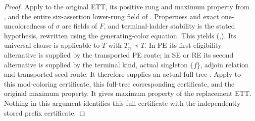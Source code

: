 \begin{proof}
Apply  to the original ETT, its positive rung and maximum
property from , and the entire
six-assertion lower-rung field of
. Properness and exact
one-uncoloredness of $\sigma$ are fields of $F$, and terminal-ladder
stability is the stated hypothesis, rewritten using the generating-color
equation. This yields (,\sigma).
Its universal clause is applicable to $T$ with $T_n\prec T$. In PE its
first eligibility alternative is supplied by the transported PE route;
in SE or RE its second alternative is supplied by the terminal kind,
actual singleton $\{f\}$, adjoin relation and transported seed route.
It therefore supplies an actual full-tree
. Apply
 to this mod-coloring certificate,
this full-tree corresponding certificate, and the original maximum
property. It gives maximum property of the replacement ETT. Nothing
in this argument identifies this full certificate with the independently
stored prefix certificate.
\end{proof}

